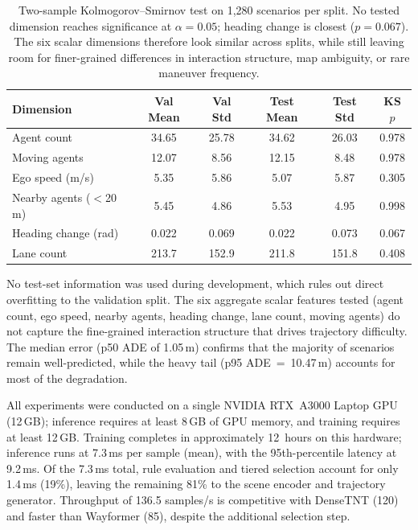 \begin{table}[t]
\centering
\caption{Validation vs.\ Test Distributional Comparison (1{,}280 Scenarios per Split)}
\label{tab:val_test_distribution}
\setlength{\tabcolsep}{2.5pt}
\begin{tabular}{lccccc}
\toprule
\textbf{Dimension} & \textbf{Val Mean} & \textbf{Val Std} & \textbf{Test Mean} & \textbf{Test Std} & \textbf{KS $p$} \\
\midrule
Agent count & 34.65 & 25.78 & 34.62 & 26.03 & 0.978 \\
Moving agents & 12.07 & 8.56 & 12.15 & 8.48 & 0.978 \\
Ego speed (m/s) & 5.35 & 5.86 & 5.07 & 5.87 & 0.305 \\
Nearby agents ($<$20\,m) & 5.45 & 4.86 & 5.53 & 4.95 & 0.998 \\
Heading change (rad) & 0.022 & 0.069 & 0.022 & 0.073 & 0.067 \\
Lane count & 213.7 & 152.9 & 211.8 & 151.8 & 0.408 \\
\bottomrule
\end{tabular}
\vspace{1mm}
\caption*{\footnotesize Two-sample Kolmogorov--Smirnov test on 1{,}280 scenarios per split.  No tested dimension reaches significance at $\alpha{=}0.05$; heading change is closest ($p{=}0.067$).  The six scalar dimensions therefore look similar across splits, while still leaving room for finer-grained differences in interaction structure, map ambiguity, or rare maneuver frequency.}
\end{table}

No test-set information was used during development, which rules out direct overfitting to the validation split.  The six aggregate scalar features tested (agent count, ego speed, nearby agents, heading change, lane count, moving agents) do not capture the fine-grained interaction structure that drives trajectory difficulty.  The median error (p50 ADE of 1.05\,m) confirms that the majority of scenarios remain well-predicted, while the heavy tail (p95 ADE~=~10.47\,m) accounts for most of the degradation.

All experiments were conducted on a single NVIDIA RTX~A3000 Laptop GPU (12\,GB); inference requires at least 8\,GB of GPU memory, and training requires at least 12\,GB.  Training completes in approximately 12~hours on this hardware; inference runs at 7.3\,ms per sample (mean), with the 95th-percentile latency at 9.2\,ms.  Of the 7.3\,ms total, rule evaluation and tiered selection account for only 1.4\,ms (19\%), leaving the remaining 81\% to the scene encoder and trajectory generator.  Throughput of 136.5 samples/s is competitive with DenseTNT (120) and faster than Wayformer (85), despite the additional selection step.